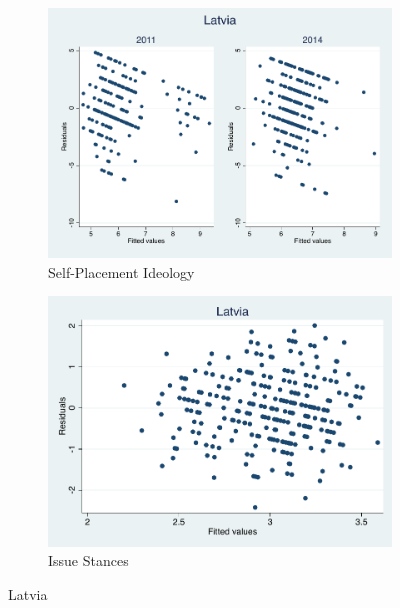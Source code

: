 \documentclass[12pt, titlepage]{article}
\begin{document}
\begin{figure}[H]
	\centering
	\begin{subfigure}[b]{0.475\textwidth}   
		\centering 
		\includegraphics[width=\textwidth]{Residuals/CountryIdeo/Latvia}
		\caption{Self-Placement Ideology}
	\end{subfigure}
	\hfill
	\begin{subfigure}[b]{0.475\textwidth}
		\centering 
		\includegraphics[width=\textwidth]{Residuals/CountryLib/Latvia}
		\caption{Issue Stances}
	\end{subfigure}
	\caption{Latvia}
	\label{Latvia}
\end{figure}
\end{document}
